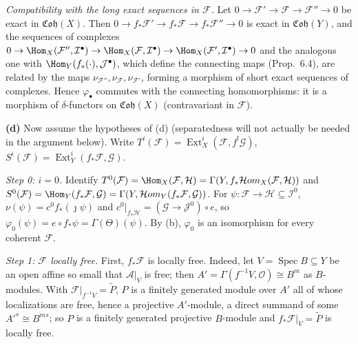 \documentclass[11pt]{article}
\begin{document}
\emph{Compatibility with the long exact sequences in $\mathcal F$.} Let $0\to\mathcal F'\to\mathcal F\to\mathcal F''\to0$ be exact in $\mathfrak{Coh}(X)$. Then $0\to f_*\mathcal F'\to f_*\mathcal F\to f_*\mathcal F''\to0$ is exact in $\mathfrak{Coh}(Y)$, and the sequences of complexes $0\to\Hom_X(\mathcal F'',\mathcal I^\bullet)\to\Hom_X(\mathcal F,\mathcal I^\bullet)\to\Hom_X(\mathcal F',\mathcal I^\bullet)\to0$ and the analogous one with $\Hom_Y(f_*(\cdot),\mathcal J^\bullet)$, which define the connecting maps (Prop.~6.4), are related by the maps $\nu_{\mathcal F''},\nu_{\mathcal F},\nu_{\mathcal F'}$, forming a morphism of short exact sequences of complexes. Hence $\varphi_\bullet$ commutes with the connecting homomorphisms: it is a morphism of $\delta$-functors on $\mathfrak{Coh}(X)$ (contravariant in $\mathcal F$).

\textbf{(d)} Now assume the hypotheses of (d) (separatedness will not actually be needed in the argument below). Write $T^i(\mathcal F)=\operatorname{Ext}^i_X(\mathcal F,f^!\mathcal G)$, $S^i(\mathcal F)=\operatorname{Ext}^i_Y(f_*\mathcal F,\mathcal G)$.

\emph{Step 0: $i=0$.} Identify $T^0(\mathcal F)=\Hom_X(\mathcal F,\mathcal H)=\Gamma(Y,f_*\mathcal{H}om_X(\mathcal F,\mathcal H))$ and $S^0(\mathcal F)=\Hom_Y(f_*\mathcal F,\mathcal G)=\Gamma(Y,\mathcal{H}om_Y(f_*\mathcal F,\mathcal G))$. For $\psi\colon\mathcal F\to\mathcal H\subseteq\mathcal I^0$, $\nu(\psi)=c^0f_*(\jmath\psi)$ and $c^0|_{f_*\mathcal H}=(\mathcal G\to\mathcal J^0)\circ e$, so $\varphi_0(\psi)=e\circ f_*\psi=\Gamma(\Theta)(\psi)$. By (b), $\varphi_0$ is an isomorphism for every coherent $\mathcal F$.

\emph{Step 1: $\mathcal F$ locally free.} First, $f_*\mathcal F$ is locally free. Indeed, let $V=\operatorname{Spec}B\subseteq Y$ be an open affine so small that $\mathcal A|_V$ is free; then $A'=\Gamma(f^{-1}V,\mathcal O)\cong B^m$ as $B$-modules. With $\mathcal F|_{f^{-1}V}=\widetilde P$, $P$ is a finitely generated module over $A'$ all of whose localizations are free, hence a projective $A'$-module, a direct summand of some $A'^s\cong B^{ms}$; so $P$ is a finitely generated projective $B$-module and $f_*\mathcal F|_V=\widetilde P$ is locally free.
\end{document}
